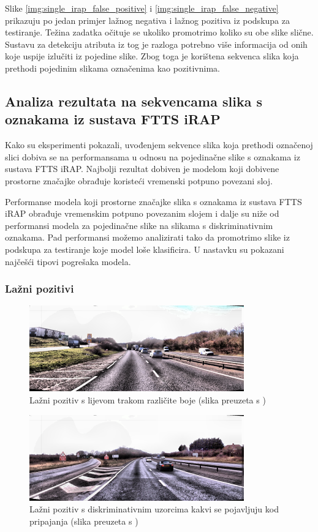 \documentclass[times, utf8, diplomski, numeric]{fer}
\begin{document}
Slike \ref{img:single_irap_false_positive} i \ref{img:single_irap_false_negative} prikazuju po jedan primjer lažnog negativa i lažnog pozitiva iz podskupa za testiranje.
Težina zadatka očituje se ukoliko promotrimo koliko su obe slike slične.
Sustavu za detekciju atributa iz tog je razloga potrebno više informacija od onih koje uspije izlučiti iz pojedine slike.
Zbog toga je korištena sekvenca slika koja prethodi pojedinim slikama označenima kao pozitivnima.

\subsection{Analiza rezultata na sekvencama slika s oznakama iz sustava FTTS iRAP}
Kako su eksperimenti pokazali, uvođenjem sekvence slika koja prethodi označenoj slici dobiva se na performansama u odnosu na pojedinačne slike s oznakama iz sustava FTTS iRAP. 
Najbolji rezultat dobiven je modelom koji dobivene prostorne značajke obrađuje koristeći vremenski potpuno povezani sloj.

Performanse modela koji prostorne značajke slika s oznakama iz sustava FTTS iRAP obrađuje vremenskim potpuno povezanim slojem i dalje su niže od performansi modela za pojedinačne slike na slikama s diskriminativnim oznakama.
Pad performansi možemo analizirati tako da promotrimo slike iz podskupa za testiranje koje model loše klasificira. 
U nastavku su pokazani najčešći tipovi pogrešaka modela.

\subsubsection{Lažni pozitivi }
\begin{figure}[H]
\centering
\includegraphics[scale=1]{images/fp_1.png}
\caption{Lažni pozitiv s lijevom trakom različite boje (slika preuzeta s \citep{url:ftts_irap})}
\label{img:fp_1}
\end{figure}

\begin{figure}[H]
\centering
\includegraphics[scale=1]{images/fp_2.png}
\caption{Lažni pozitiv s diskriminativnim uzorcima kakvi se pojavljuju kod pripajanja (slika preuzeta s \citep{url:ftts_irap})}
\label{img:fp_2}
\end{figure}
\end{document}
